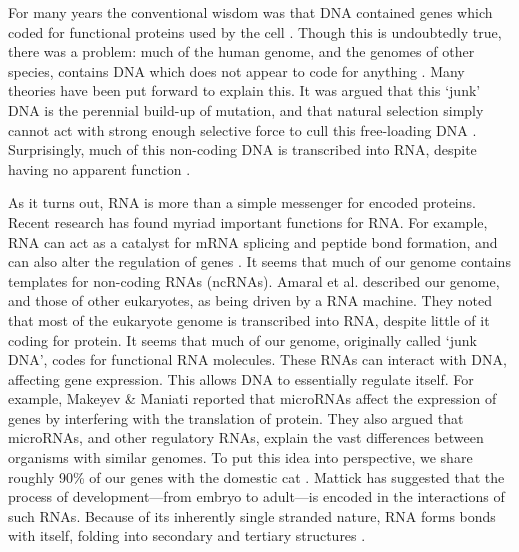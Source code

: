 \documentclass{cshonours}
\begin{document}
For many years the conventional wisdom was that DNA contained genes which coded for functional proteins used by the cell \cite{albertsessential}. Though this is undoubtedly true, there was a problem: much of the human genome, and the genomes of other species, contains DNA which does not appear to code for anything \cite{beaton1999eukaryotic}. Many theories have been put forward to explain this. It was argued that this `junk' DNA is the perennial build-up of mutation, and that natural selection simply cannot act with strong enough selective force to cull this free-loading DNA \cite{beaton1999eukaryotic}. Surprisingly, much of this non-coding DNA is transcribed into RNA, despite having no apparent function \cite{leung2013coral}. 

As it turns out, RNA is more than a simple messenger for encoded proteins. Recent research has found myriad important functions for RNA. For example, RNA can act as a catalyst for mRNA splicing and peptide bond formation, and can also alter the regulation of genes \cite{xu2012statistical}. It seems that much of our genome contains templates for non-coding RNAs (ncRNAs). Amaral et al. \cite{amaral2008eukaryotic} described our genome, and those of other eukaryotes, as being driven by a RNA machine. They noted that most of the eukaryote genome is transcribed into RNA, despite little of it coding for protein. It seems that much of our genome, originally called `junk DNA', codes for functional RNA molecules. These RNAs can interact with DNA, affecting gene expression. This allows DNA to essentially regulate itself. For example, Makeyev \& Maniati \cite{makeyev2008multilevel} reported that microRNAs affect the expression of genes by interfering with the translation of protein. They also argued that microRNAs, and other regulatory RNAs, explain the vast differences between organisms with similar genomes. To put this idea into perspective, we share roughly 90\% of our genes with the domestic cat \cite{pontius2007initial}. Mattick \cite{mattick2007new} has suggested that the process of development---from embryo to adult---is encoded in the interactions of such RNAs. Because of its inherently single stranded nature, RNA forms bonds with itself, folding into secondary and tertiary structures \cite{conn1998rna}.
\end{document}
